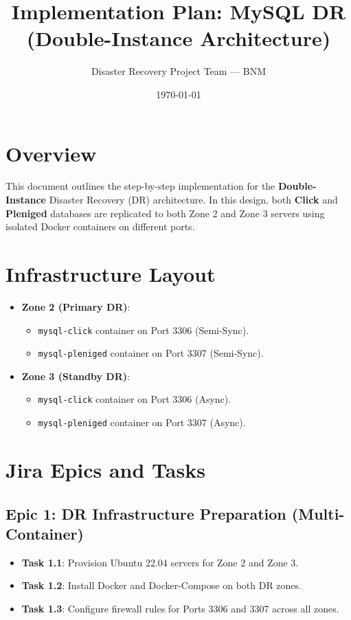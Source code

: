 \documentclass[11pt,a4paper]{article}
\title{Implementation Plan: MySQL DR (Double-Instance Architecture)}
\author{Disaster Recovery Project Team — BNM}
\date{\today}
\begin{document}
\maketitle

\section{Overview}
This document outlines the step-by-step implementation for the \textbf{Double-Instance} Disaster Recovery (DR) architecture. In this design, both \textbf{Click} and \textbf{Pleniged} databases are replicated to both Zone 2 and Zone 3 servers using isolated Docker containers on different ports.

\section{Infrastructure Layout}
\begin{itemize}
    \item \textbf{Zone 2 (Primary DR)}:
        \begin{itemize}
            \item \texttt{mysql-click} container on Port 3306 (Semi-Sync).
            \item \texttt{mysql-pleniged} container on Port 3307 (Semi-Sync).
        \end{itemize}
    \item \textbf{Zone 3 (Standby DR)}:
        \begin{itemize}
            \item \texttt{mysql-click} container on Port 3306 (Async).
            \item \texttt{mysql-pleniged} container on Port 3307 (Async).
        \end{itemize}
\end{itemize}

\section{Jira Epics and Tasks}

\subsection{Epic 1: DR Infrastructure Preparation (Multi-Container)}
\begin{itemize}[label=$\square$]
    \item \textbf{Task 1.1}: Provision Ubuntu 22.04 servers for Zone 2 and Zone 3.
    \item \textbf{Task 1.2}: Install Docker and Docker-Compose on both DR zones.
    \item \textbf{Task 1.3}: Configure firewall rules for Ports 3306 and 3307 across all zones.
\end{itemize}
\end{document}
